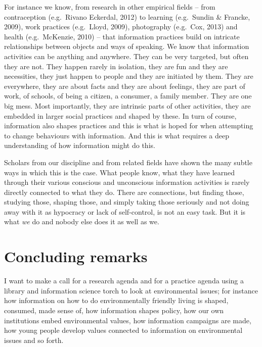 \documentclass[a4paper,
fontsize=11pt,
oneside,
numbers=noperiodatend,
parskip=half-,
bibliography=totoc,
final
]{scrartcl}
\begin{document}
For instance we know, from research in other empirical fields -- from
contraception (e.g.~Rivano Eckerdal, 2012) to learning (e.g.~Sundin \&
Francke, 2009), work practices (e.g.~Lloyd, 2009), photography
(e.g.~Cox, 2013) and health (e.g.~McKenzie, 2010) -- that information
practices build on intricate relationships between objects and ways of
speaking. We know that information activities can be anything and
anywhere. They can be very targeted, but often they are not. They happen
rarely in isolation, they are fun and they are necessities, they just
happen to people and they are initiated by them. They are everywhere,
they are about facts and they are about feelings, they are part of work,
of schools, of being a citizen, a consumer, a family member. They are
one big mess. Most importantly, they are intrinsic parts of other
activities, they are embedded in larger social practices and shaped by
these. In turn of course, information also shapes practices and this is
what is hoped for when attempting to change behaviours with information.
And this is what requires a deep understanding of how information might
do this.

Scholars from our discipline and from related fields have shown the many
subtle ways in which this is the case. What people know, what they have
learned through their various conscious and unconscious information
activities is rarely directly connected to what they do. There are
connections, but finding those, studying those, shaping those, and
simply taking those seriously and not doing away with it as hypocracy or
lack of self-control, is not an easy task. But it is what \emph{we} do
and nobody else does it as well as we.

\section*{Concluding remarks}\label{concluding-remarks}

I want to make a call for a research agenda and for a practice agenda
using a library and information science torch to look at environmental
issues; for instance how information on how to do environmentally
friendly living is shaped, consumed, made sense of, how information
shapes policy, how our own institutions embed environmental values, how
information campaigns are made, how young people develop values
connected to information on environmental issues and so forth.
\end{document}
